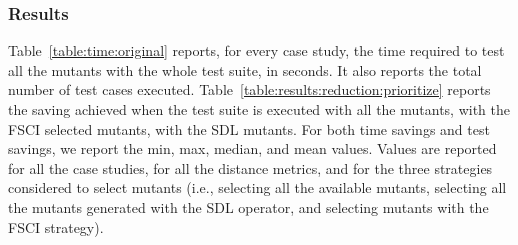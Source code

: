 
%
%











\subsubsection*{Results}

Table~\ref{table:time:original} reports, for every case study, the time required to test all the mutants with the whole test suite, in seconds. It also reports  the total number of test cases executed. 
Table~\ref{table:results:reduction:prioritize} reports the saving achieved when the \APPR test suite is executed with all the mutants, with the FSCI selected mutants, with the SDL mutants. For both time savings and test savings, we report the min, max, median, and mean values. Values are reported for all the case studies, for all the distance metrics, and for the three strategies considered to select mutants (i.e., selecting all the available mutants, selecting all the mutants generated with the SDL operator, and selecting mutants with the FSCI strategy).

